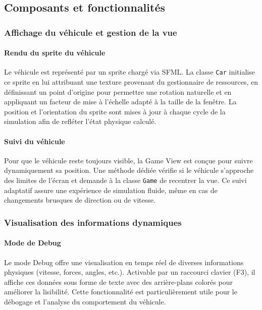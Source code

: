 \begin{itemize}
\subsection{Composants et fonctionnalités}\label{subsec:composants-et-fonctionnalites}

\subsubsection{Affichage du véhicule et gestion de la vue}\label{subsubsec:affichage-du-vehicule-et-gestion-de-la-vue}

\paragraph{Rendu du sprite du véhicule}
Le véhicule est représenté par un sprite chargé via SFML. La classe \texttt{Car} initialise ce sprite en lui attribuant une texture provenant du gestionnaire de ressources, en définissant un point d'origine pour permettre une rotation naturelle et en appliquant un facteur de mise à l'échelle adapté à la taille de la fenêtre.
La position et l'orientation du sprite sont mises à jour à chaque cycle de la simulation afin de refléter l'état physique calculé.

\paragraph{Suivi du véhicule}
Pour que le véhicule reste toujours visible, la Game View est conçue pour suivre dynamiquement sa position.
Une méthode dédiée vérifie si le véhicule s'approche des limites de l'écran et demande à la classe \texttt{Game} de recentrer la vue.
Ce suivi adaptatif assure une expérience de simulation fluide, même en cas de changements brusques de direction ou de vitesse.

\subsubsection{Visualisation des informations dynamiques}\label{subsubsec:visualisation-des-informations-dynamiques}

\paragraph{Mode de Debug}
Le mode Debug offre une visualisation en temps réel de diverses informations physiques (vitesse, forces, angles, etc.). Activable par un raccourci clavier (F3), il affiche ces données sous forme de texte avec des arrière-plans colorés pour améliorer la lisibilité.
Cette fonctionnalité est particulièrement utile pour le débogage et l'analyse du comportement du véhicule.


\end{itemize}
